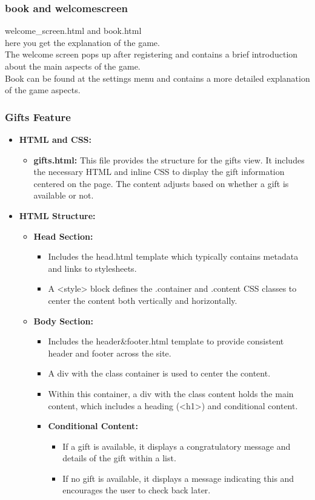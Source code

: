\documentclass[12pt]{article}
\begin{document}
\subsubsection{book and welcomescreen}
\begin{itemize}
    welcome\_screen.html and book.html\\
    here you get the explanation of the game.\\
    The welcome screen pops up after registering and contains a brief introduction about the main aspects of the game.\\
    Book can be found at the settings menu and contains a more detailed explanation of the game aspects.
\end{itemize}

\subsubsection{Gifts Feature}
\begin{itemize}
\item \textbf{HTML and CSS:}
\begin{itemize}
\item \textbf{gifts.html:} This file provides the structure for the gifts view. It includes the necessary HTML and inline CSS to display the gift information centered on the page. The content adjusts based on whether a gift is available or not.
\end{itemize}
\item \textbf{HTML Structure:}
\begin{itemize}
\item \textbf{Head Section:}
\begin{itemize}
\item Includes the head.html template which typically contains metadata and links to stylesheets.
\item A <style> block defines the .container and .content CSS classes to center the content both vertically and horizontally.
\end{itemize}
\item \textbf{Body Section:}
\begin{itemize}
\item Includes the header&footer.html template to provide consistent header and footer across the site.
\item A div with the class container is used to center the content.
\item Within this container, a div with the class content holds the main content, which includes a heading (<h1>) and conditional content.
\item \textbf{Conditional Content:}
\begin{itemize}
\item If a gift is available, it displays a congratulatory message and details of the gift within a list.
\item If no gift is available, it displays a message indicating this and encourages the user to check back later.
\end{itemize}
\end{itemize}
\end{itemize}
\end{itemize}
\end{document}
